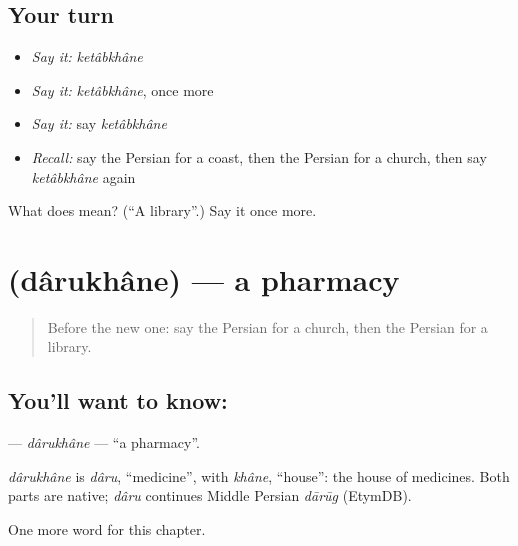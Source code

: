 \subsection*{Your turn}
\begin{itemize}
\raggedright
  \item \emph{Say it:} \emph{ketâbkhâne}
  \item \emph{Say it:} \emph{ketâbkhâne}, once more
  \item \emph{Say it:} say \emph{ketâbkhâne}
  \item \emph{Recall:} say the Persian for a coast, then the Persian for a church, then say \emph{ketâbkhâne} again
\end{itemize}

\begin{tcolorbox}[breakable,colback=teal!4,colframe=teal!35!black,title={Before you move on}]
What does  mean? (\textquotedblleft{}A library\textquotedblright{}.) Say it once more.
\end{tcolorbox}
\section[\texorpdfstring{\fa{داروخانه} (dârukhâne)}{داروخانه (dârukhâne)}]{ (dârukhâne) — a pharmacy}

\label{lesson:FA-C88-darukhane}



\begin{quote}
Before the new one: say the Persian for a church, then the Persian for a library.
\end{quote}

\subsection*{You'll want to know: }
\textbf{} — \emph{dârukhâne} — \textquotedblleft{}a pharmacy\textquotedblright{}.

\begin{cousinweb}
\emph{dârukhâne} is \emph{dâru}, \textquotedblleft{}medicine\textquotedblright{}, with \emph{khâne}, \textquotedblleft{}house\textquotedblright{}: the house of medicines. Both parts are native; \emph{dâru} continues Middle Persian \emph{dārūg} (EtymDB).
\end{cousinweb}

\begin{grammarlens}[title={What you've built}]
One more word for this chapter.
\end{grammarlens}

